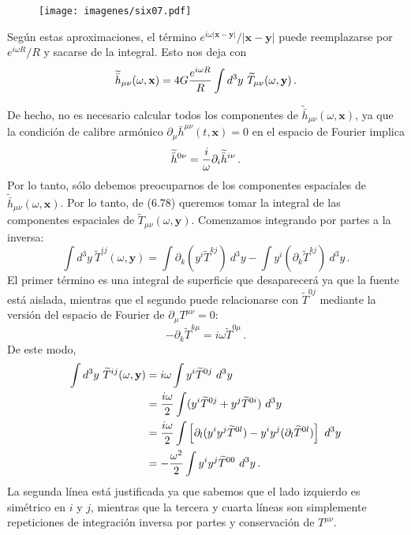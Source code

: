 \documentclass[11pt,b5paper,openany,twoside]{book}
\newcommand{\mn}{{\mu\nu}}
\newcommand{\p}[1]{{\partial_{#1}}}
\def\bh{{\bar h}}
\def\x{\mathbf{x}}
\def\y{\mathbf{y}}
\begin{document}
\begin{figure}[h]
\centering
\texttt{[image: imagenes/six07.pdf]}
\end{figure}

\noindent
Según estas aproximaciones, el término $e^{i\omega |\x-\y |}/|\x-\y |$ puede reemplazarse por $e^{i\omega R}/R$ y sacarse de la integral.
Esto nos deja con
\begin{equation}
\widetilde\bh_\mn(\omega,\x) = 4G {{e^{i\omega R}}\over R}
\int d^3y~\widetilde T_\mn(\omega,\y)\,.\label{6.78}
\end{equation}

De hecho, no es necesario calcular todos los componentes de $\widetilde\bh_\mn(\omega,\x)$, ya que la condición de calibre armónico $\p\mu \bh^\mn(t,\x)=0$ en el espacio de Fourier implica
\begin{equation}
\widetilde\bh{}^{0\nu} = {i\over \omega}\p{i}\widetilde\bh{}^{i\nu}\,.
\label{6.79}
\end{equation}
Por lo tanto, sólo debemos preocuparnos de los componentes espaciales de $\widetilde\bh_\mn(\omega,\x)$.
Por lo tanto, de (6.78) queremos tomar la integral de las componentes espaciales de $\widetilde T_\mn(\omega,\y)$.
Comenzamos integrando por partes a la inversa:
\begin{equation}
\int d^3y~\widetilde T^{ij}(\omega,\y)=\int \p{k}
(y^i\widetilde T^{kj})~d^3y - \int y^i(\p{k}\widetilde T^{kj})~d^3y
\,.\label{6.80}
\end{equation}
El primer término es una integral de superficie que desaparecerá ya que la fuente está aislada, mientras que el segundo puede relacionarse con $\widetilde T^{0j}$ mediante la versión del espacio de Fourier de $\p\mu T^\mn=0$:
\begin{equation}
-\p{k}\widetilde T^{k\mu}=i\omega \widetilde T^{0\mu}\,.
\label{6.81}
\end{equation}
De este modo,
\begin{align}
\int d^3y~\widetilde T^{ij}(\omega,\y) &=
i\omega \int y^i \widetilde T^{0j}~d^3y  \notag \\
&=  {{i\omega}\over 2}\int (y^i \widetilde T^{0j}
+y^j \widetilde T^{0i})~d^3y  \notag \\
&=  {{i\omega}\over 2}\int\left[\p{l}(y^i y^j \widetilde T^{0l})
-y^i y^j (\p{l}\widetilde T^{0l})\right]~d^3y  \notag \\
&=  -{{\omega^2}\over 2}\int y^i y^j \widetilde T^{00}~d^3y\,.
\label{6.82}
\end{align}
La segunda línea está justificada ya que sabemos que el lado izquierdo es simétrico en $i$ y $j$, mientras que la tercera y cuarta líneas son simplemente repeticiones de integración inversa por partes y conservación de $T^\mn$.
\end{document}
